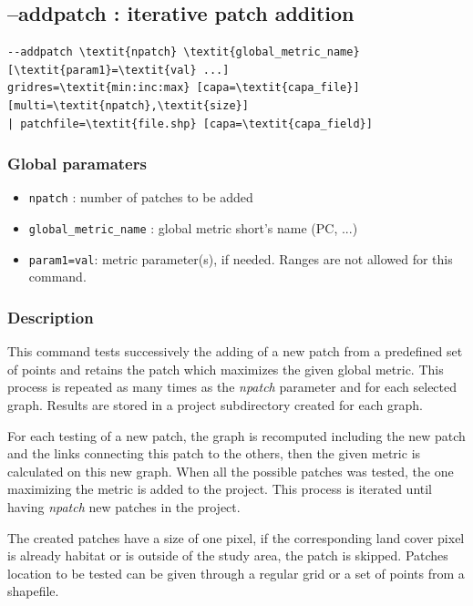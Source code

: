 \documentclass[a4paper,10pt]{report}
\begin{document}
\subsection{--addpatch : iterative patch addition}
\begin{Verbatim}[commandchars=\\\{\}]
--addpatch \textit{npatch} \textit{global_metric_name} [\textit{param1}=\textit{val} ...]
gridres=\textit{min:inc:max} [capa=\textit{capa_file}] [multi=\textit{npatch},\textit{size}]
| patchfile=\textit{file.shp} [capa=\textit{capa_field}]
\end{Verbatim}

\subsubsection{Global paramaters}
\begin{itemize}
	\item \verb|npatch| : number of patches to be added
	\item \verb|global_metric_name| : global metric short's name (PC, ...)
	\item \verb|param1=val|: metric parameter(s), if needed. Ranges are not allowed for this command.
\end{itemize}

\subsubsection{Description}
This command tests successively the adding of a new patch from a predefined set of points and retains the patch which maximizes the given global metric.
This process is repeated as many times as the \textit{npatch} parameter and for each selected graph. 
Results are stored in a project subdirectory created for each graph.

For each testing of a new patch, the graph is recomputed including the new patch and the links connecting this patch to the others, then the given metric is calculated on this new graph.
When all the possible patches was tested, the one maximizing the metric is added to the project.
This process is iterated until having \textit{npatch} new patches in the project.

The created patches have a size of one pixel, if the corresponding land cover pixel is already habitat or is outside of the study area, the patch is skipped.
Patches location to be tested can be given through a regular grid or a set of points from a shapefile.
\end{document}

